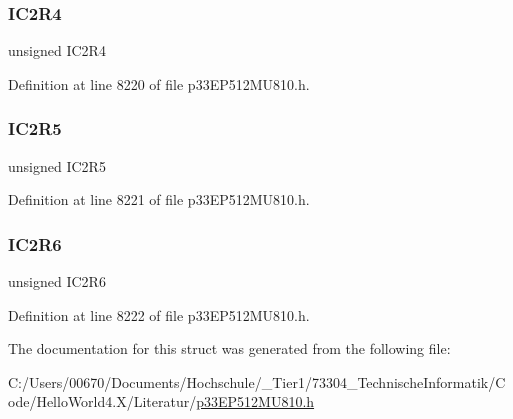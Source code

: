 \subsubsection{\texorpdfstring{I\+C2\+R4}{IC2R4}}
{\footnotesize\ttfamily unsigned I\+C2\+R4}



Definition at line 8220 of file p33\+E\+P512\+M\+U810.\+h.

\mbox{\label{structtag_r_p_i_n_r7_b_i_t_s_a902a0c5d364b83b492c37e7d483540a3}} 
\subsubsection{\texorpdfstring{I\+C2\+R5}{IC2R5}}
{\footnotesize\ttfamily unsigned I\+C2\+R5}



Definition at line 8221 of file p33\+E\+P512\+M\+U810.\+h.

\mbox{\label{structtag_r_p_i_n_r7_b_i_t_s_a2230453bf7bad40f2b9c7a8f7a8973e2}} 
\subsubsection{\texorpdfstring{I\+C2\+R6}{IC2R6}}
{\footnotesize\ttfamily unsigned I\+C2\+R6}



Definition at line 8222 of file p33\+E\+P512\+M\+U810.\+h.



The documentation for this struct was generated from the following file\+:\begin{DoxyCompactItemize}
\item 
C\+:/\+Users/00670/\+Documents/\+Hochschule/\+\_\+\+Tier1/73304\+\_\+\+Technische\+Informatik/\+Code/\+Hello\+World4.\+X/\+Literatur/\hyperlink{p33_e_p512_m_u810_8h}{p33\+E\+P512\+M\+U810.\+h}\end{DoxyCompactItemize}

